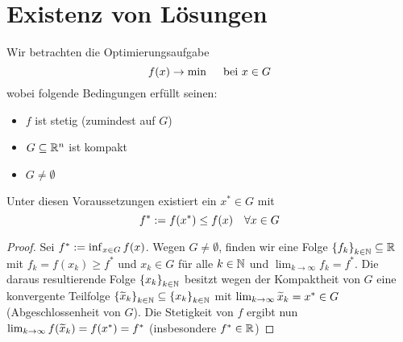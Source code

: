 \section{Existenz von Lösungen}

Wir betrachten die Optimierungsaufgabe
\begin{equation}
	f(x) \to \min \quad \text{ bei } x \in G \label{eq: 2.1}
\end{equation}
wobei folgende Bedingungen erfüllt seinen:
\begin{itemize}[nolistsep, topsep=-\parskip]
	\item $f$ ist stetig (zumindest auf $G$)
	\item $G \subseteq \mathbb{R}^n$ ist kompakt
	\item $G \neq \emptyset$
\end{itemize}
\vspace{\parskip}

\begin{satz}[Weierstrass] \label{satz: 2.1_weierstrass}
	Unter diesen Voraussetzungen existiert ein $x^\ast \in G$ mit 
	\begin{equation*}
		f^\ast \mathrel{:=} f(x^\ast) \le f(x) \quad \forall x \in G
	\end{equation*}
\end{satz}
\begin{proof}
	Sei $f^\ast \mathrel{:=} \inf_{x \in G} f(x)$. Wegen $G \neq \emptyset$, finden wir eine Folge $\left\{ f_k \right\}_{k \in \mathbb{N}} \subseteq \mathbb{R}$ mit $f_k = f(x_k) \ge f^\ast$ und $x_k \in G$ für alle $k \in \mathbb{N}$ und $\lim_{k \to \infty} f_k = f^\ast$. Die daraus resultierende Folge $\left\{ x_k \right\}_{k \in \mathbb{N}}$ besitzt wegen der Kompaktheit von $G$ eine konvergente Teilfolge $\left\{ \widetilde{x}_k \right\}_{k \in \mathbb{N}} \subseteq \left\{ x_k \right\}_{k \in \mathbb{N}}$ mit $\lim_{k \to \infty} \widetilde{x}_k = x^\ast \in G$ (Abgeschlossenheit von $G$). Die Stetigkeit von $f$ ergibt nun $\lim_{k \to \infty} f(\widetilde{x}_k) = f(x^\ast) = f^\ast$ (insbesondere $f^\ast \in \mathbb{R}$)
\end{proof}

